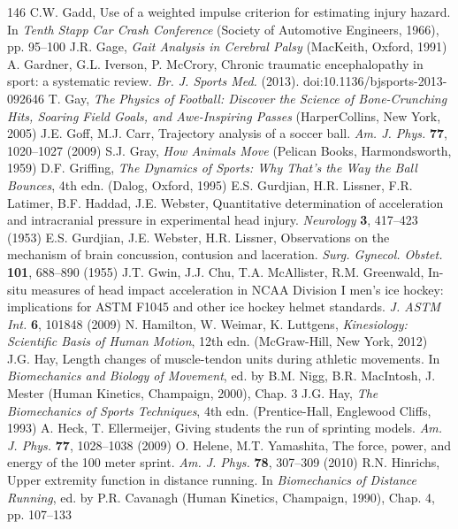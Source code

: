 \documentclass[12pt]{book}
\begin{document}
\begin{thebibliography}{146}
 C.W. Gadd, Use of a weighted impulse criterion for estimating injury hazard. In \textit{Tenth Stapp Car Crash Conference} (Society of Automotive Engineers, 1966), pp. 95--100
 J.R. Gage, \textit{Gait Analysis in Cerebral Palsy} (MacKeith, Oxford, 1991)
 A. Gardner, G.L. Iverson, P. McCrory, Chronic traumatic encephalopathy in sport: a systematic review. \textit{Br. J. Sports Med.} (2013). doi:10.1136/bjsports-2013-092646
 T. Gay, \textit{The Physics of Football: Discover the Science of Bone-Crunching Hits, Soaring Field Goals, and Awe-Inspiring Passes} (HarperCollins, New York, 2005)
 J.E. Goff, M.J. Carr, Trajectory analysis of a soccer ball. \textit{Am. J. Phys.} \textbf{77}, 1020--1027 (2009)
 S.J. Gray, \textit{How Animals Move} (Pelican Books, Harmondsworth, 1959)
 D.F. Griffing, \textit{The Dynamics of Sports: Why That's the Way the Ball Bounces}, 4th edn. (Dalog, Oxford, 1995)
 E.S. Gurdjian, H.R. Lissner, F.R. Latimer, B.F. Haddad, J.E. Webster, Quantitative determination of acceleration and intracranial pressure in experimental head injury. \textit{Neurology} \textbf{3}, 417--423 (1953)
 E.S. Gurdjian, J.E. Webster, H.R. Lissner, Observations on the mechanism of brain concussion, contusion and laceration. \textit{Surg. Gynecol. Obstet.} \textbf{101}, 688--890 (1955)
 J.T. Gwin, J.J. Chu, T.A. McAllister, R.M. Greenwald, In-situ measures of head impact acceleration in NCAA Division I men's ice hockey: implications for ASTM F1045 and other ice hockey helmet standards. \textit{J. ASTM Int.} \textbf{6}, 101848 (2009)
 N. Hamilton, W. Weimar, K. Luttgens, \textit{Kinesiology: Scientific Basis of Human Motion}, 12th edn. (McGraw-Hill, New York, 2012)
 J.G. Hay, Length changes of muscle-tendon units during athletic movements. In \textit{Biomechanics and Biology of Movement}, ed. by B.M. Nigg, B.R. MacIntosh, J. Mester (Human Kinetics, Champaign, 2000), Chap. 3
 J.G. Hay, \textit{The Biomechanics of Sports Techniques}, 4th edn. (Prentice-Hall, Englewood Cliffs, 1993)
 A. Heck, T. Ellermeijer, Giving students the run of sprinting models. \textit{Am. J. Phys.} \textbf{77}, 1028--1038 (2009)
 O. Helene, M.T. Yamashita, The force, power, and energy of the 100 meter sprint. \textit{Am. J. Phys.} \textbf{78}, 307--309 (2010)
 R.N. Hinrichs, Upper extremity function in distance running. In \textit{Biomechanics of Distance Running}, ed. by P.R. Cavanagh (Human Kinetics, Champaign, 1990), Chap. 4, pp. 107--133

\end{thebibliography}
\end{document}
